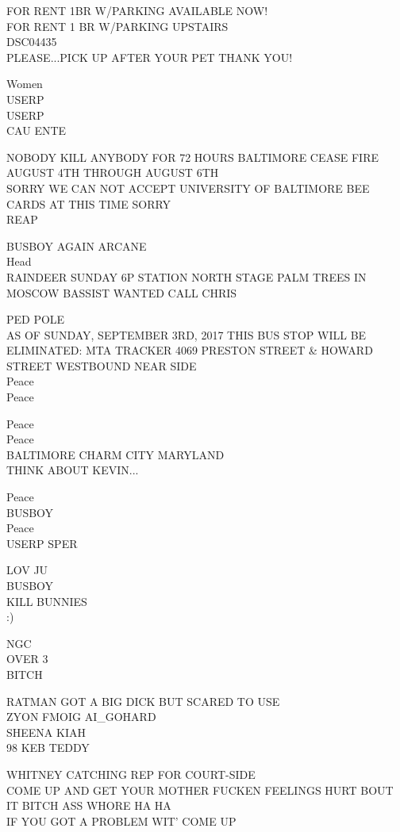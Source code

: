 \documentclass[10pt,letterpaper]{article}
\begin{document}
FOR RENT 1BR W/PARKING AVAILABLE NOW!\\
FOR RENT 1 BR W/PARKING UPSTAIRS\\
DSC04435\\
PLEASE...PICK UP AFTER YOUR PET THANK YOU!

Women\\
USERP\\
USERP\\
CAU ENTE

NOBODY KILL ANYBODY FOR 72 HOURS BALTIMORE CEASE FIRE AUGUST 4TH THROUGH AUGUST 6TH\\
SORRY WE CAN NOT ACCEPT UNIVERSITY OF BALTIMORE BEE CARDS AT THIS TIME SORRY\\
REAP

BUSBOY AGAIN ARCANE\\
Head\\
RAINDEER SUNDAY 6P STATION NORTH STAGE PALM TREES IN MOSCOW BASSIST WANTED CALL CHRIS

PED POLE\\
AS OF SUNDAY, SEPTEMBER 3RD, 2017 THIS BUS STOP WILL BE ELIMINATED: MTA TRACKER 4069 PRESTON STREET \& HOWARD STREET WESTBOUND NEAR SIDE\\
Peace\\
Peace

Peace\\
Peace\\
BALTIMORE CHARM CITY MARYLAND\\
THINK ABOUT KEVIN...

Peace\\
BUSBOY\\
Peace\\
USERP SPER

LOV JU\\
BUSBOY\\
KILL BUNNIES\\
:)

NGC\\
OVER 3\\
BITCH

RATMAN GOT A BIG DICK BUT SCARED TO USE\\
ZYON FMOIG AI\_GOHARD\\
SHEENA KIAH\\
98 KEB TEDDY

WHITNEY CATCHING REP FOR COURT{-}SIDE\\
COME UP AND GET YOUR MOTHER FUCKEN FEELINGS HURT BOUT IT BITCH ASS WHORE HA HA\\
IF YOU GOT A PROBLEM WIT' COME UP
\end{document}
